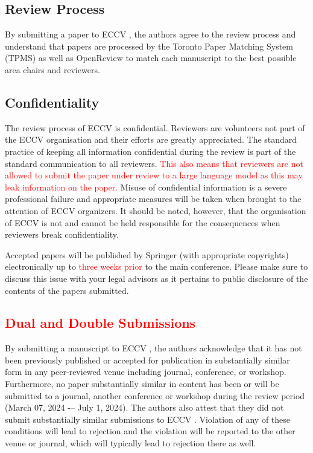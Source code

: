 \documentclass[runningheads]{llncs}
\begin{document}
\subsection{Review Process}
By submitting a paper to ECCV \ECCVyear{}, the authors agree to the review process and understand that papers are processed by the Toronto Paper Matching System (TPMS) as well as OpenReview to match each manuscript to the best possible area chairs and reviewers.


\subsection{Confidentiality}
The review process of ECCV \ECCVyear{} is confidential. 
Reviewers are volunteers not part of the ECCV organisation and their efforts are greatly appreciated. 
The standard practice of keeping all information confidential during the review is part of the standard communication to all reviewers. 
\textcolor{red}{This also means that reviewers are not allowed to submit the paper under review to a large language model as this may leak information on the paper.}
Misuse of confidential information is a severe professional failure and appropriate measures will be taken when brought to the attention of ECCV organizers. 
It should be noted, however, that the organisation of ECCV is not and cannot be held responsible for the consequences when reviewers break confidentiality.

Accepted papers will be published by Springer (with appropriate copyrights) electronically up to \textcolor{red}{three weeks prior} to the main conference.
Please make sure to discuss this issue with your legal advisors as it pertains to public disclosure of the contents of the papers submitted.


\subsection{\textcolor{red}{Dual and Double Submissions}}
By submitting a manuscript to ECCV \ECCVyear{}, the authors acknowledge that it has not been previously published or accepted for publication in substantially similar form in any peer-reviewed venue including journal, conference, or workshop. 
Furthermore, no paper substantially similar in content has been or will be submitted to a journal, another conference or workshop during the review period (March 07, 2024 -– July 1, 2024). 
The authors also attest that they did not submit substantially similar submissions to ECCV \ECCVyear{}. 
Violation of any of these conditions will lead to rejection and the violation will be reported to the other venue or journal, which will typically lead to rejection there as well. 
\end{document}
